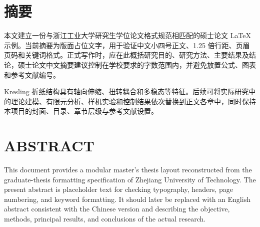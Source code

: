 \chapter*{摘\quad 要}

本文建立一份与浙江工业大学研究生学位论文格式规范相匹配的硕士论文 \LaTeX{} 示例。当前摘要为版面占位文字，用于验证中文小四号正文、1.25 倍行距、页眉页码和关键词格式。正式写作时，应在此概括研究目的、研究方法、主要结果及结论，硕士论文中文摘要建议控制在学校要求的字数范围内，并避免放置公式、图表和参考文献编号。

Kresling 折纸结构具有轴向伸缩、扭转耦合和多稳态等特征。后续可将实际研究中的理论建模、有限元分析、样机实验和控制结果依次替换到正文各章中，同时保持本项目的封面、目录、章节层级与参考文献设置。


\cleardoublepage
\chapter*{ABSTRACT}

This document provides a modular master's thesis layout reconstructed from the graduate-thesis formatting specification of Zhejiang University of Technology. The present abstract is placeholder text for checking typography, headers, page numbering, and keyword formatting. It should later be replaced with an English abstract consistent with the Chinese version and describing the objective, methods, principal results, and conclusions of the actual research.

